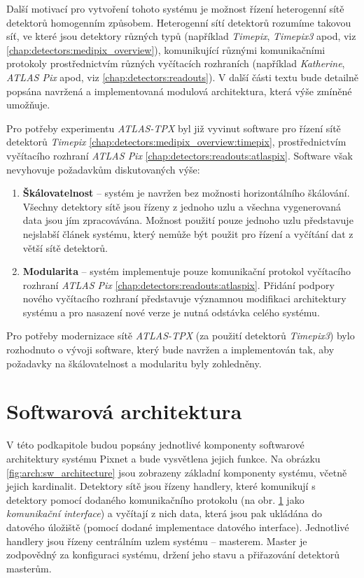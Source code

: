  Další motivací pro vytvoření tohoto systému je možnost řízení heterogenní sítě detektorů homogenním způsobem. Heterogenní sítí detektorů rozumíme takovou síť, ve které jsou detektory různých typů (například \textit{Timepix}, \textit{Timepix3} apod, viz \ref{chap:detectors:medipix_overview}), komunikující různými komunikačními protokoly prostřednictvím různých vyčítacích rozhraních (například \textit{Katherine}, \textit{ATLAS Pix} apod, viz \ref{chap:detectors:readouts}). V další části textu bude detailně popsána navržená a implementovaná modulová architektura, která výše zmíněné umožňuje.

 Pro potřeby experimentu \textit{ATLAS-TPX} byl již vyvinut software \cite{atlastpx_sw,BegeraBcThesis2016} pro řízení sítě detektorů \textit{Timepix} \ref{chap:detectors:medipix_overview:timepix}, prostřednictvím vyčítacího rozhraní \textit{ATLAS Pix} \ref{chap:detectors:readouts:atlaspix}. Software však nevyhovuje požadavkům diskutovaných výše:
 \begin{enumerate}[label=(\roman*)]
     \item \textbf{Škálovatelnost} -- systém je navržen bez možnosti horizontálního škálování. Všechny detektory sítě jsou řízeny z jednoho uzlu a všechna vygenerovaná data jsou jím zpracovávána. Možnost použití pouze jednoho uzlu představuje nejslabší článek systému, který nemůže být použit pro řízení a vyčítání dat z větší sítě detektorů.
     \item \textbf{Modularita} -- systém implementuje pouze komunikační protokol vyčítacího rozhraní \textit{ATLAS Pix} \ref{chap:detectors:readouts:atlaspix}. Přidání podpory nového vyčítacího rozhraní představuje významnou modifikaci architektury systému a pro nasazení nové verze je nutná odstávka celého systému.
 \end{enumerate}
Pro potřeby modernizace sítě \textit{ATLAS-TPX} (za použití detektorů \textit{Timepix3}) bylo rozhodnuto o vývoji software, který bude navržen a implementován tak, aby požadavky na škálovatelnost a modularitu byly zohledněny.

\section{Softwarová architektura}\label{chap:arch:sw}
V této podkapitole budou popsány jednotlivé komponenty softwarové architektury systému Pixnet a bude vysvětlena jejich funkce. Na obrázku \ref{fig:arch:sw_architecture} jsou zobrazeny základní komponenty systému, včetně jejich kardinalit. Detektory sítě jsou řízeny handlery, které komunikují s detektory pomocí dodaného komunikačního protokolu (na obr. \ref{chap:arch:sw} jako \textit{komunikační interface}) a vyčítají z nich data, která jsou pak ukládána do datového úložiště (pomocí dodané implementace datového interface). Jednotlivé handlery jsou řízeny centrálním uzlem systému -- masterem. Master je zodpovědný za konfiguraci systému, držení jeho stavu a přiřazování detektorů masterům.

